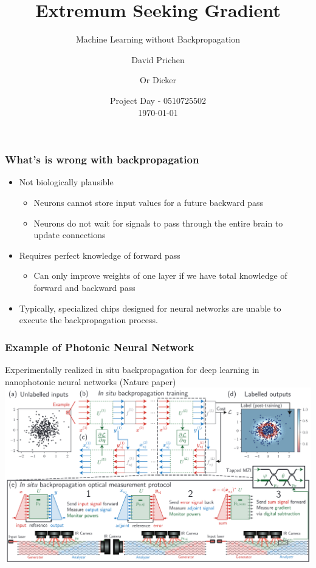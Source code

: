 \documentclass[
	11pt, %
]{beamer}
\title[ESG]{Extremum Seeking Gradient} %
\subtitle{Machine Learning without Backpropagation} %
\author[Prichen, Dicker]{David Prichen \and Or Dicker} %
\institute[TAU]{Tel Aviv University} %
\date[]{Project Day - 0510725502 \\ \today} %
\begin{document}

\begin{frame}
	\titlepage %
\end{frame}




\begin{frame}
  \frametitle{What's is wrong with backpropagation}
  \begin{itemize}
  \item Not biologically plausible
    \begin{itemize}
    \item Neurons cannot store input values for a future
      backward pass
      \item Neurons do not wait for signals to pass through the
entire brain to update connections
\end{itemize}
\item Requires perfect knowledge of forward pass
  \begin{itemize}
\item Can only improve weights of one layer if we have total
knowledge of forward and backward pass
\end{itemize}
\item Typically, specialized chips designed for neural networks are unable to execute the backpropagation process.
\end{itemize}
\end{frame}


\begin{frame}
  \frametitle{Example of Photonic Neural Network}
    Experimentally realized in situ backpropagation for deep learning in nanophotonic
neural networks (Nature paper)
  \includegraphics[width=0.8\columnwidth]{../report/images/photonic_nn.png}
\end{frame}
\end{document}
